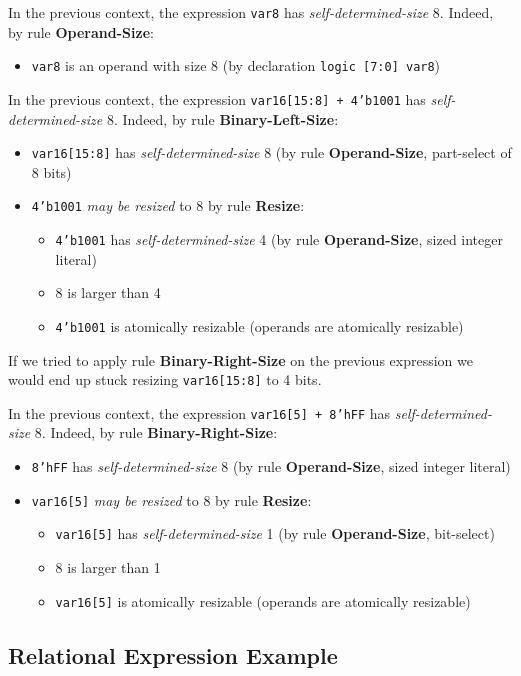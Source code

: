 \documentclass{article}
\newcommand{\sv}[1]{\texttt{#1}}
\newcommand{\sds}{\emph{self-determined-size}}
\newcommand{\mbr}{\emph{may be resized}}
\begin{document}
In the previous context, the expression \sv{var8} has
\sds{} 8. Indeed, by rule \textbf{Operand-Size}:
\begin{itemize}
  \item \sv{var8} is an operand with size 8 (by declaration
    \sv{logic [7:0] var8})
\end{itemize}

In the previous context, the expression \sv{var16[15:8] + 4'b1001} has
\sds{} 8. Indeed, by rule \textbf{Binary-Left-Size}:

\begin{itemize}
  \item \sv{var16[15:8]} has \sds{} 8 (by rule
    \textbf{Operand-Size}, part-select of 8 bits)
  \item \sv{4'b1001} \mbr{} to 8 by rule \textbf{Resize}:
    \begin{itemize}
      \item \sv{4'b1001} has \sds{} 4 (by rule
        \textbf{Operand-Size}, sized integer literal)
      \item 8 is larger than 4
      \item \sv{4'b1001} is atomically resizable (operands are
        atomically resizable)
    \end{itemize}
\end{itemize}

If we tried to apply rule \textbf{Binary-Right-Size} on the previous expression
we would end up stuck resizing \sv{var16[15:8]} to 4 bits.

In the previous context, the expression \sv{var16[5] + 8'hFF} has
\sds{} 8. Indeed, by rule \textbf{Binary-Right-Size}:

\begin{itemize}
  \item \sv{8'hFF} has \sds{} 8 (by rule
    \textbf{Operand-Size}, sized integer literal)
  \item \sv{var16[5]} \mbr{} to 8 by rule \textbf{Resize}:
    \begin{itemize}
      \item \sv{var16[5]} has \sds{} 1 (by rule
        \textbf{Operand-Size}, bit-select)
      \item 8 is larger than 1
      \item \sv{var16[5]} is atomically resizable (operands are
        atomically resizable)
    \end{itemize}
\end{itemize}

\subsection{Relational Expression Example}
\end{document}
